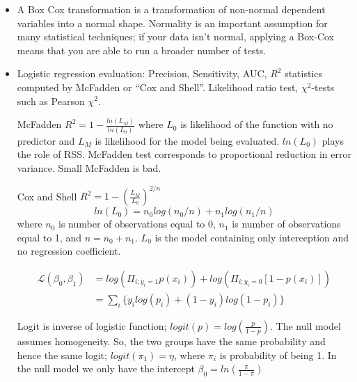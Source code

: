\begin{itemize}
\begin{enumerate}
                          \item Error terms are assumed to be normally
                          distributed.
                  
            \end{enumerate}
            
 \item A Box Cox transformation is a transformation of 
      non-normal dependent variables into a normal shape. 
      Normality is an important assumption for many statistical 
      techniques; if your data isn't normal, applying a Box-Cox 
     means that you are able to run a broader number of tests.
     
     \item Logistic regression evaluation: Precision, Sensitivity, AUC, 
     $R^2$ statistics computed by McFadden or ``Cox and Shell''. 
     Likelihood ratio test, $\chi^2$-tests such as Pearson $\chi^2$.
     
     McFadden $R^2 = 1 - \frac{ln(L_M)}{ln(L_0)}$ where $L_0$ 
     is likelihood of the function with no predictor and $L_M$ is likelihood 
     for the model being evaluated.  $ln(L_0)$ plays the role of RSS.  
     McFadden test corresponds to proportional reduction in 
     error variance. Small McFadden is bad.
     
     Cox and Shell $R^2 = 1 - \left (\frac{L_M}{L_0}\right )^{2/n}$
     \[ln(L_0) = n_0 log(n_0/n) + n_1 log(n_1/n) \]
     \noindent where $n_0$ is number of observations equal to 0,
     $n_1$ is number of observations equal to 1, and $n = n_0+n_1$.
     $L_0$ is the model containing only interception 
     and no regression coefficient.
     
     
     \begin{equation*}
         \begin{aligned}
  \mathcal{L}(\beta_0, \beta_1) &= log(\Pi_{i; y_i=1} p(x_i)) + log(\Pi_{i; y_i=0} [1-p(x_i)])\\ 
               &= \sum_i \{y_i log(p_i) + (1-y_i) log(1-p_i)\}
           \end{aligned}
     \end{equation*} 
     
      Logit is inverse of logistic function; $logit(p) = log(\frac{p}{1-p})$.
      The null model assumes homogeneity. 
      So, the two groups have the same probability and 
      hence the same logit;  $logit (\pi_1) = \eta$, where $\pi_i$ is probability of being 1.
      In the null model we only have the intercept $\beta_0 = ln(\frac{\pi}{1-\pi})$
     

\end{itemize}
